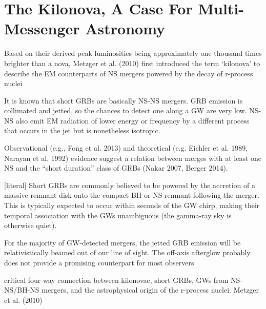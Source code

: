 \chapter{The Kilonova, A Case For Multi-Messenger Astronomy}


Based on their derived peak luminosities being approximately one thousand times brighter than a nova, Metzger et al. (2010) first introduced the term `kilonova' to describe the EM counterparts of NS mergers powered by the decay of r-process nuclei

It is known that short GRBs are basically NS-NS mergers.
GRB emission is collimated and jetted, so the chances to detect one along a GW are very low.
NS-NS also emit EM radiation of lower energy or frequency by a different process that occurs in the jet but is nonetheless isotropic. 

Observational (e.g., Fong et al. 2013) and theoretical (e.g. Eichler et al. 1989, Narayan et al. 1992) evidence suggest a relation between merges with at least one NS and the ``short duration'' class of GRBs (Nakar 2007, Berger 2014). 


[literal] Short GRBs are commonly believed to be powered by the accretion of a massive remnant disk onto the compact BH or NS remnant following the merger. This is typically expected to occur within seconds of the GW chirp, making their temporal association with the GWs unambiguous (the gamma-ray sky is otherwise quiet).

For the majority of GW-detected mergers, the jetted GRB emission will be relativistically beamed out of our line of sight.
The off-axis afterglow probably does not provide a promising counterpart for most observers

critical four-way connection between kilonovae, short GRBs, GWs from NS-NS/BH-NS mergers, and the astrophysical origin of the r-process nuclei. Metzger et al. (2010)

